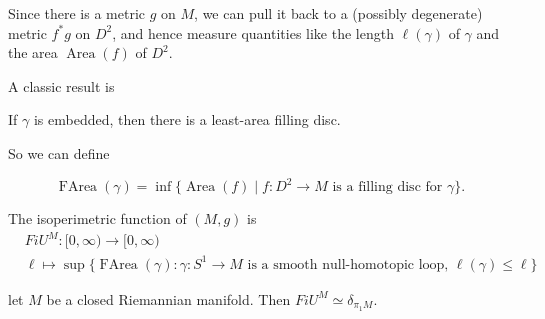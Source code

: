 \documentclass[a4paper]{article}
\DeclareMathOperator\Area{Area}
\DeclareMathOperator\FArea{FArea}
\begin{document}
Since there is a metric $g$ on $M$, we can pull it back to a (possibly degenerate) metric $f^* g$ on $D^2$, and hence measure quantities like the length $\ell(\gamma)$ of $\gamma$ and the area $\Area(f)$ of $D^2$.

A classic result is
\begin{thm} %
  If $\gamma$ is embedded, then there is a least-area filling disc.
\end{thm}
So we can define
\begin{defi}[$\FArea$]\index{$\FArea$}
  \[
    \FArea(\gamma) = \inf \{\Area(f) \mid f: D^2 \to M\text{ is a filling disc for }\gamma\}.
  \]
\end{defi}

\begin{defi}
  The isoperimetric function of $(M, g)$ is
  \begin{align*}
    &FiU^M: [0, \infty) \to [0, \infty)\\
    &\ell \mapsto \sup\{\FArea(\gamma): \gamma: S^1 \to M\text{ is a smooth null-homotopic loop, }\ell(\gamma) \leq \ell\}
  \end{align*}
\end{defi}

\begin{thm}
  let $M$ be a closed Riemannian manifold. Then $FiU^M \simeq \delta_{\pi_1 M}$.
\end{thm}
\end{document}
